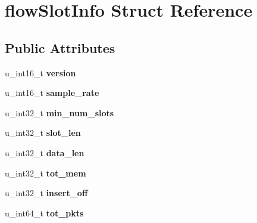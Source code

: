 \hypertarget{structflow_slot_info}{
\section{flowSlotInfo Struct Reference}
\label{structflow_slot_info}
}
\subsection*{Public Attributes}
\begin{DoxyCompactItemize}
\item 
\hypertarget{structflow_slot_info_afa6a0eace5114d298dbea8ab42c03d17}{
u\_\-int16\_\-t {\bfseries version}}
\label{structflow_slot_info_afa6a0eace5114d298dbea8ab42c03d17}

\item 
\hypertarget{structflow_slot_info_a0933c168b64b74bff8aca7dcc1d6bf81}{
u\_\-int16\_\-t {\bfseries sample\_\-rate}}
\label{structflow_slot_info_a0933c168b64b74bff8aca7dcc1d6bf81}

\item 
\hypertarget{structflow_slot_info_abb758bfdfcc8f0942ef3232537bf55c4}{
u\_\-int32\_\-t {\bfseries min\_\-num\_\-slots}}
\label{structflow_slot_info_abb758bfdfcc8f0942ef3232537bf55c4}

\item 
\hypertarget{structflow_slot_info_adc721d86e6e8a6101ab57add5f886522}{
u\_\-int32\_\-t {\bfseries slot\_\-len}}
\label{structflow_slot_info_adc721d86e6e8a6101ab57add5f886522}

\item 
\hypertarget{structflow_slot_info_abc7cc26cf89d667e48dff344d28b0c9e}{
u\_\-int32\_\-t {\bfseries data\_\-len}}
\label{structflow_slot_info_abc7cc26cf89d667e48dff344d28b0c9e}

\item 
\hypertarget{structflow_slot_info_ac64eaab7f5706c0f9b1986158c630866}{
u\_\-int32\_\-t {\bfseries tot\_\-mem}}
\label{structflow_slot_info_ac64eaab7f5706c0f9b1986158c630866}

\item 
\hypertarget{structflow_slot_info_a6c00f973b99ef0127645a4fccbad3fb2}{
u\_\-int32\_\-t {\bfseries insert\_\-off}}
\label{structflow_slot_info_a6c00f973b99ef0127645a4fccbad3fb2}

\item 
\hypertarget{structflow_slot_info_aac36519dd965d6da0003009b2836b5f6}{
u\_\-int64\_\-t {\bfseries tot\_\-pkts}}
\label{structflow_slot_info_aac36519dd965d6da0003009b2836b5f6}


\end{DoxyCompactItemize}
